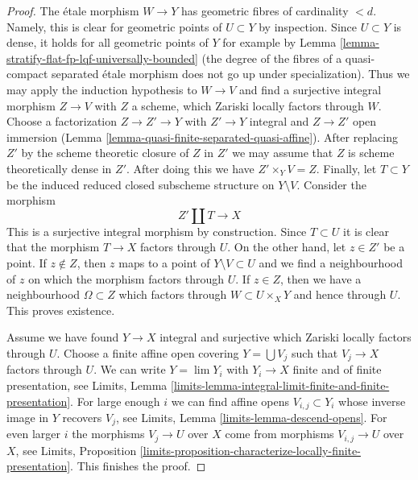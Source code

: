 \begin{proof}
\medskip\noindent
The \'etale morphism $W \to Y$ has geometric fibres of cardinality $< d$.
Namely, this is clear for geometric points of $U \subset Y$ by inspection.
Since $U \subset Y$ is dense, it holds for all geometric points of $Y$
for example by Lemma
\ref{lemma-stratify-flat-fp-lqf-universally-bounded}
(the degree of the fibres of a quasi-compact separated \'etale morphism
does not go up under specialization). Thus we may apply the induction
hypothesis to $W \to V$ and find a surjective integral morphism
$Z \to V$ with $Z$ a scheme, which Zariski locally factors through $W$.
Choose a factorization $Z \to Z' \to Y$ with $Z' \to Y$ integral and
$Z \to Z'$ open immersion
(Lemma \ref{lemma-quasi-finite-separated-quasi-affine}).
After replacing $Z'$ by the scheme theoretic closure of $Z$ in $Z'$
we may assume that $Z$ is scheme theoretically dense in $Z'$.
After doing this we have $Z' \times_Y V = Z$. Finally,
let $T \subset Y$ be the induced reduced closed subscheme structure
on $Y \setminus V$. Consider the morphism
$$
Z' \amalg T \longrightarrow X
$$
This is a surjective integral morphism by construction.
Since $T \subset U$ it is clear that the morphism $T \to X$
factors through $U$. On the other hand, let $z \in Z'$
be a point. If $z \not \in Z$, then $z$ maps to a point of
$Y \setminus V \subset U$ and we find a neighbourhood of $z$
on which the morphism factors through $U$.
If $z \in Z$, then we have a neighbourhood $\Omega \subset Z$
which factors through $W \subset U \times_X Y$ and hence through $U$.
This proves existence.

\medskip\noindent
Assume we have found $Y \to X$ integral and surjective which Zariski
locally factors through $U$. Choose a finite affine open covering
$Y = \bigcup V_j$ such that $V_j \to X$ factors through $U$. We can
write $Y = \lim Y_i$ with $Y_i \to X$ finite and of finite
presentation, see Limits, Lemma
\ref{limits-lemma-integral-limit-finite-and-finite-presentation}.
For large enough $i$ we can find affine opens $V_{i, j} \subset Y_i$
whose inverse image in $Y$ recovers $V_j$, see
Limits, Lemma \ref{limits-lemma-descend-opens}.
For even larger $i$ the morphisms $V_j \to U$ over $X$ come
from morphisms $V_{i, j} \to U$ over $X$, see
Limits, Proposition
\ref{limits-proposition-characterize-locally-finite-presentation}.
This finishes the proof.
\end{proof}